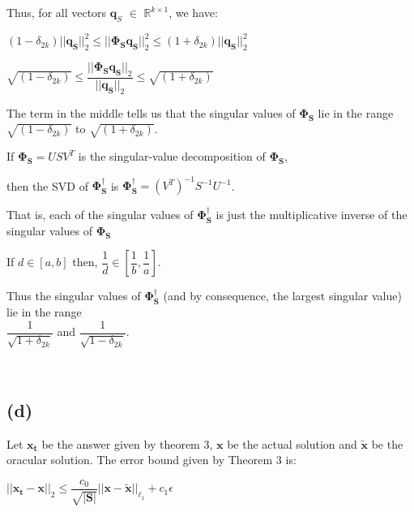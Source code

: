 \documentclass[fleqn, 11pt]{article}
\newcommand{\bs}[1]{\boldsymbol{#1}}
\newcommand{\pss}[0]{\boldsymbol{\Phi^{\dagger}_S}}
\begin{document}
\newpage

Thus, for all vectors $\bs{q}_{S}$  $\in$ $\mathbb{R}^{k \times 1}$, we have: 


\begin{center}
    $(1-\delta_{2k}) || \bs{q_S} ||_2^2 \leq || \bs{ \Phi_S q_S }||_2^2 \leq (1+\delta_{2k}) 
|| \bs{q_S} ||_2^2    $

\end{center}

\begin{center}
    $\sqrt{(1-\delta_{2k})}  \leq \dfrac{|| \bs{ \Phi_S q_S }||_2}{|| \bs{q_S} ||_2} \leq \sqrt{(1+\delta_{2k})}
   $

\end{center}

The term in the middle tells us that the singular values of $\bs{\Phi_S}$ lie in the range 
$\sqrt{(1-\delta_{2k})} $ to $\sqrt{(1+\delta_{2k})} $.

\medskip

If $\bs{\Phi_S}= USV^T$ is the singular-value decomposition of $\bs{\Phi_S}$,

\smallskip

then the SVD of $\pss$ is $\pss= (V^T)^{-1}S^{-1}U^{-1}$.

\medskip

That is, each of the singular values of $\pss$ is just the multiplicative inverse 
of the singular values of $\bs{\Phi_S}$ 

If $d \in [a,b]$  then, $\dfrac{1}{d} \in \left[\dfrac{1}{b} , \dfrac{1}{a} \right]$. 

Thus the singular values of $\pss$ (and by consequence, the largest singular value) lie
in the range \\ 
$\dfrac{1}{\sqrt{1+ \delta_{2k}}}$ and 
$\dfrac{1}{\sqrt{1- \delta_{2k}}}$. 


~\\

\subsection*{(d)}

Let $\bs{x_t}$ be the answer given by theorem 3, $\bs{x}$ be the actual solution 
and $\bs{\tilde{x}}$ be the oracular solution.
The error bound given by Theorem 3 is:

\smallskip

$ ||\bs{x_t-x}||_2 \leq \dfrac{c_0}{\sqrt{|\bs{S}|}} || \bs{x - \tilde{x}} ||_{\ell_1} + c_1
\epsilon $
\end{document}
